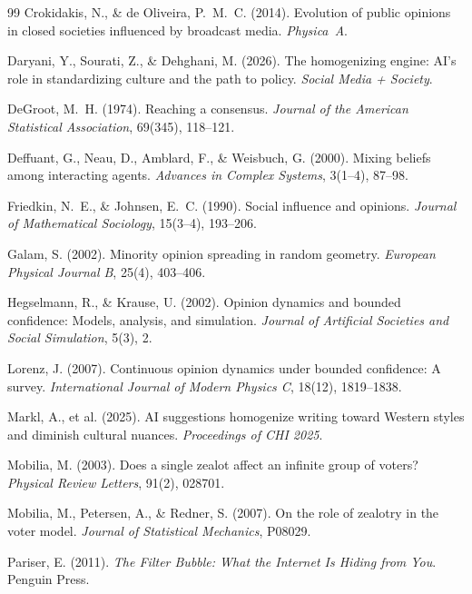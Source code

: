 \documentclass{article}
\theoremstyle{plain}
\theoremstyle{definition}
\theoremstyle{remark}
\begin{document}
\begin{thebibliography}{99}
Crokidakis, N., \& de Oliveira, P.~M.~C. (2014).
Evolution of public opinions in closed societies influenced by broadcast media.
\textit{Physica~A}.

Daryani, Y., Sourati, Z., \& Dehghani, M. (2026).
The homogenizing engine: AI's role in standardizing culture and the path to policy.
\textit{Social Media + Society}.

DeGroot, M.~H. (1974).
Reaching a consensus.
\textit{Journal of the American Statistical Association}, 69(345), 118--121.

Deffuant, G., Neau, D., Amblard, F., \& Weisbuch, G. (2000).
Mixing beliefs among interacting agents.
\textit{Advances in Complex Systems}, 3(1--4), 87--98.

Friedkin, N.~E., \& Johnsen, E.~C. (1990).
Social influence and opinions.
\textit{Journal of Mathematical Sociology}, 15(3--4), 193--206.

Galam, S. (2002).
Minority opinion spreading in random geometry.
\textit{European Physical Journal B}, 25(4), 403--406.

Hegselmann, R., \& Krause, U. (2002).
Opinion dynamics and bounded confidence: Models, analysis, and simulation.
\textit{Journal of Artificial Societies and Social Simulation}, 5(3), 2.

Lorenz, J. (2007).
Continuous opinion dynamics under bounded confidence: A survey.
\textit{International Journal of Modern Physics C}, 18(12), 1819--1838.

Markl, A., et al. (2025).
AI suggestions homogenize writing toward Western styles and diminish cultural nuances.
\textit{Proceedings of CHI 2025}.

Mobilia, M. (2003).
Does a single zealot affect an infinite group of voters?
\textit{Physical Review Letters}, 91(2), 028701.

Mobilia, M., Petersen, A., \& Redner, S. (2007).
On the role of zealotry in the voter model.
\textit{Journal of Statistical Mechanics}, P08029.

Pariser, E. (2011).
\textit{The Filter Bubble: What the Internet Is Hiding from You}.
Penguin Press.


\end{thebibliography}
\end{document}
